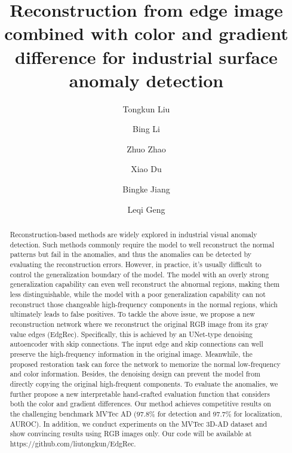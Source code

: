 \documentclass[5p, twocolumn]{elsarticle}[draft]
\begin{document}
\begin{frontmatter}




\title{Reconstruction from edge image combined with color and gradient difference for industrial surface anomaly detection}

\author[Address1]{Tongkun Liu}
\author[Address1,Address2]{Bing Li}
\author[Address1]{Zhuo Zhao}
\author[Address1]{Xiao Du}
\author[Address1]{Bingke Jiang}
\author[Address1]{Leqi Geng}

\address[Address1]{State Key Laboratory for Manufacturing System Engineering, Xi’an Jiaotong University,No.99 Yanxiang Road, Yanta District, 710054, Xi’an, Shaanxi, China}


\address[Address2]{International Joint Research Laboratory for Micro/Nano Manufacturing and Measurement Technologies, Xi’an Jiaotong University,No.99 Yanxiang Road, Yanta District, 710054, Xi’an, Shaanxi, China}


          
\begin{abstract}
Reconstruction-based methods are widely explored in industrial visual anomaly detection. Such methods commonly require the model to well reconstruct the normal patterns but fail in the anomalies, and thus the anomalies can be detected by evaluating the reconstruction errors. However, in practice, it's usually difficult to control the generalization boundary of the model. The model with an overly strong generalization capability can even well reconstruct the abnormal regions, making them less distinguishable, while the model with a poor generalization capability can not reconstruct those changeable high-frequency components in the normal regions, which ultimately leads to false positives. To tackle the above issue, we propose a new reconstruction network where we reconstruct the original RGB image from its gray value edges (EdgRec). Specifically, this is achieved by an UNet-type denoising autoencoder with skip connections. The input edge and skip connections can well preserve the high-frequency information in the original image. Meanwhile, the proposed restoration task can force the network to memorize the normal low-frequency and color information. Besides, the denoising design can prevent the model from directly copying the original high-frequent components. To evaluate the anomalies, we further propose a new interpretable hand-crafted evaluation function that considers both the color and gradient differences. Our method achieves competitive results on the challenging benchmark MVTec AD (97.8\% for detection and 97.7\% for localization, AUROC). In addition, we conduct experiments on the MVTec 3D-AD dataset and show convincing results using RGB images only. Our code will be available at https://github.com/liutongkun/EdgRec.
\end{abstract}








\end{frontmatter}
\end{document}
